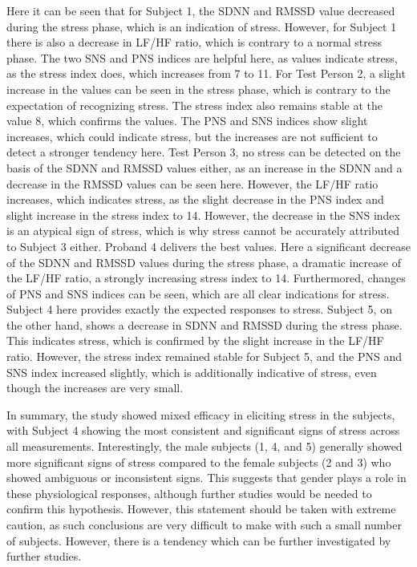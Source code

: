 Here it can be seen that for Subject 1, the SDNN and RMSSD value decreased during the stress phase, which is an indication of stress.
However, for Subject 1 there is also a decrease in LF/HF ratio, which is contrary to a normal stress phase.
The two SNS and PNS indices are helpful here, as values indicate stress, as the stress index does, which increases from 7 to 11.
For Test Person 2, a slight increase in the values can be seen in the stress phase, which is contrary to the expectation of recognizing stress.
The stress index also remains stable at the value 8, which confirms the values. 
The PNS and SNS indices show slight increases, which could indicate stress, but the increases are not sufficient to detect a stronger tendency here. 
Test Person 3, no stress can be detected on the basis of the SDNN and RMSSD values either, as an increase in the SDNN and a decrease in the RMSSD values can be seen here. 
However, the LF/HF ratio increases, which indicates stress, as the slight decrease in the PNS index and slight increase in the stress index to 14. 
However, the decrease in the SNS index is an atypical sign of stress, which is why stress cannot be accurately attributed to Subject 3 either.
Proband 4 delivers the best values.
Here a significant decrease of the SDNN and RMSSD values during the stress phase, a dramatic increase of the LF/HF ratio, a strongly increasing stress index to 14.
Furthermored, changes of PNS and SNS indices can be seen, which are all clear indications for stress.
Subject 4 here provides exactly the expected responses to stress.
Subject 5, on the other hand, shows a decrease in SDNN and RMSSD during the stress phase. 
This indicates stress, which is confirmed by the slight increase in the LF/HF ratio.
However, the stress index remained stable for Subject 5, and the PNS and SNS index increased slightly, which is additionally indicative of stress, even though the increases are very small.

In summary, the study showed mixed efficacy in eliciting stress in the subjects, with Subject 4 showing the most consistent and significant signs of stress across all measurements. Interestingly, the male subjects (1, 4, and 5) generally showed more significant signs of stress compared to the female subjects (2 and 3) who showed ambiguous or inconsistent signs. This suggests that gender plays a role in these physiological responses, although further studies would be needed to confirm this hypothesis.
However, this statement should be taken with extreme caution, as such conclusions are very difficult to make with such a small number of subjects.
However, there is a tendency which can be further investigated by further studies.

